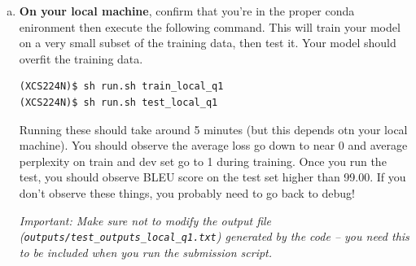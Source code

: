 \begin{enumerate}[(a)]
    \item {} \label{qn:run_tiny_enc} \textbf{On your local machine}, confirm that you're in the proper conda enironment then execute the following command. 
    This will train your model on a very small subset of the training data, then test it. Your model should overfit the training data.
\begin{lstlisting}
(XCS224N)$ sh run.sh train_local_q1
(XCS224N)$ sh run.sh test_local_q1
\end{lstlisting}

    Running these should take around 5 minutes (but this depends otn your local machine). 
    You should observe the average loss go down to near 0 and average perplexity on train and dev set go to 1 during training. Once you run the test, you should observe BLEU score on the test set higher than 99.00. 
    If you don't observe these things, you probably need to go back to debug!
    
    \textit{Important: Make sure not to modify the output file (\texttt{outputs/test\_outputs\_local\_q1.txt}) generated by the code -- you need this to be included when you run the submission script.}


\end{enumerate}